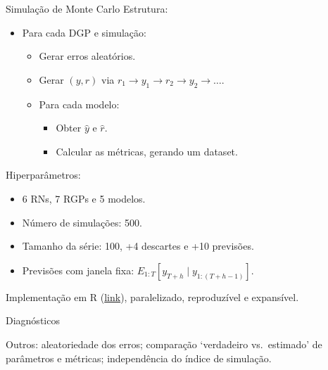 \documentclass[
  ignorenonframetext,
  brazilian,
]{beamer}
\providecommand{\tightlist}{%
  \setlength{\itemsep}{0pt}\setlength{\parskip}{0pt}}\usepackage{longtable,booktabs,array}
\begin{document}
\begin{frame}{Simulação de Monte Carlo}
\label{simulauxe7uxe3o-de-monte-carlo}
Estrutura:

\begin{itemize}
\tightlist
\item
  Para cada DGP e simulação:

  \begin{itemize}
  \tightlist
  \item
    Gerar erros aleatórios.
  \item
    Gerar \((y, r)\) via \(r_1 \to y_1 \to r_2 \to y_2 \to \dots\).
  \item
    Para cada modelo:

    \begin{itemize}
    \tightlist
    \item
      Obter \(\hat{y}\) e \(\hat{r}\).
    \item
      Calcular as métricas, gerando um dataset.
    \end{itemize}
  \end{itemize}
\end{itemize}

\pause

Hiperparâmetros:

\begin{itemize}
\tightlist
\item
  6 RNs, 7 RGPs e 5 modelos.
\item
  Número de simulações: 500.
\item
  Tamanho da série: 100, +4 descartes e +10 previsões.
\item
  Previsões com janela fixa:
  \(E_{1:T}[y_{T+h} \mid y_{1:(T + h - 1)}]\).
\end{itemize}

Implementação em R
(\href{https://github.com/ricardo-semiao/article-regime-id-performance}{link}),
paralelizado, reproduzível e expansível.
\end{frame}

\begin{frame}{Diagnósticos}
\label{diagnuxf3sticos}
\begin{table}[!htbp]

\caption{\label{tbl-estimation_issues}Problemas de estimação}

\centering{

\vspace{-0.4cm}
\resizebox{\textwidth}{!}{%
}

}

\end{table}%

Outros: aleatoriedade dos erros; comparação `verdadeiro vs.~estimado' de
parâmetros e métricas; independência do índice de simulação.
\end{frame}
\end{document}
